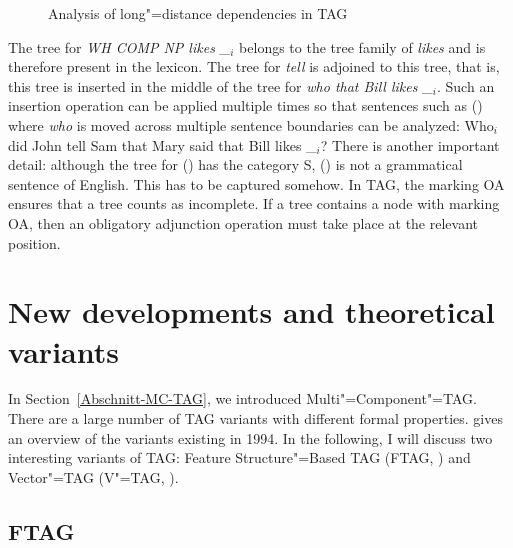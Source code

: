 \begin{figure}
\caption{\label{abb-nld-TAG}Analysis of long"=distance dependencies in TAG}
\end{figure}%
The tree for \emph{WH COMP NP likes \_$_i$} belongs to the tree family of \emph{likes} and is therefore
present in the lexicon.
The tree for \emph{tell} is adjoined to this tree, that is, this tree is inserted in the middle of the tree for
\emph{who that Bill likes \_$_i$}. Such an insertion operation can be applied multiple times so that sentences such as ()
where \emph{who} is moved across multiple sentence boundaries can be analyzed:
\ea 
Who$_i$ did John tell Sam that Mary said that Bill likes \_$_i$?
\z
%
There is another important detail: although the tree for () has the category S, () is not a grammatical
sentence of English.
\z
This has to be captured somehow. In TAG, the marking OA ensures that a tree counts as incomplete. If
a tree contains a node with marking OA, then an obligatory adjunction
operation must take place at the relevant position. 

\section{New developments and theoretical variants}

In Section~\ref{Abschnitt-MC-TAG}, we introduced Multi"=Component"=TAG. There are a large number of TAG variants with different formal properties.
\citet[\page
]{Rambow94a} gives an overview of the variants existing in 1994. In the following, I will discuss
two interesting variants of TAG: Feature Structure"=Based TAG (FTAG\indexftag, \citealp{VSJ88a}) and
Vector"=TAG (V"=TAG, \citealp{Rambow94a}). 

\subsection{FTAG}

